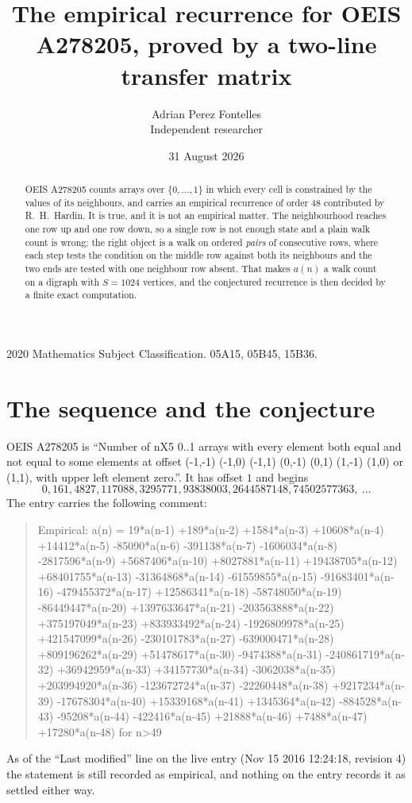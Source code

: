 \documentclass[11pt,a4paper]{article}
\title{The empirical recurrence for OEIS A278205, proved by a two-line transfer matrix}
\author{Adrian Perez Fontelles\\ \small Independent researcher}
\date{31 August 2026}
\theoremstyle{plain}
\theoremstyle{definition}
\begin{document}
\maketitle

\begin{abstract}
OEIS A278205 counts arrays over $\{0,\dots,1\}$ in which every cell is constrained by the
values of its neighbours, and carries an empirical recurrence of order $48$ contributed
by R.~H.~Hardin. It is true, and it is not an empirical matter. The neighbourhood reaches one
row up and one row down, so a single row is not enough state and a plain walk count
is wrong; the right object is a walk on ordered \emph{pairs} of consecutive rows, where
each step tests the condition on the middle row against both its neighbours and the two
ends are tested with one neighbour row absent. That makes $a(n)$ a walk count on a digraph
with $S=1024$ vertices, and the conjectured recurrence is then decided by a finite exact
computation.
\end{abstract}

\noindent\small 2020 Mathematics Subject Classification. 05A15, 05B45, 15B36.\normalsize

\section{The sequence and the conjecture}

OEIS A278205 is ``Number of nX5 0..1 arrays with every element both equal and not equal to some elements at offset (-1,-1) (-1,0) (-1,1) (0,-1) (0,1) (1,-1) (1,0) or (1,1), with upper left element zero.''. It has offset $1$ and begins
\[
0, 161, 4827, 117088, 3295771, 93838003, 2644587148, 74502577363,\ \dots
\]
The entry carries the following comment:
\begin{quote}\small
Empirical: a(n) = 19*a(n-1) +189*a(n-2) +1584*a(n-3) +10608*a(n-4) +14412*a(n-5) -85090*a(n-6) -391138*a(n-7) -1606034*a(n-8) -2817596*a(n-9) +5687406*a(n-10) +8027881*a(n-11) +19438705*a(n-12) +68401755*a(n-13) -31364868*a(n-14) -61559855*a(n-15) -91683401*a(n-16) -479455372*a(n-17) +12586341*a(n-18) -58748050*a(n-19) -86449447*a(n-20) +1397633647*a(n-21) -203563888*a(n-22) +375197049*a(n-23) +833933492*a(n-24) -1926809978*a(n-25) +421547099*a(n-26) -230101783*a(n-27) -639000471*a(n-28) +809196262*a(n-29) +51478617*a(n-30) -9474388*a(n-31) -240861719*a(n-32) +36942959*a(n-33) +34157730*a(n-34) -3062038*a(n-35) +203994920*a(n-36) -123672724*a(n-37) -22260448*a(n-38) +9217234*a(n-39) -17678304*a(n-40) +15339168*a(n-41) +1345364*a(n-42) -884528*a(n-43) -95208*a(n-44) -422416*a(n-45) +21888*a(n-46) +7488*a(n-47) +17280*a(n-48) for n>49
\end{quote}
As of the ``Last modified'' line on the live entry (Nov 15 2016 12:24:18, revision 4) the statement is
still recorded as empirical, and nothing on the entry records it as settled either way.
\end{document}
